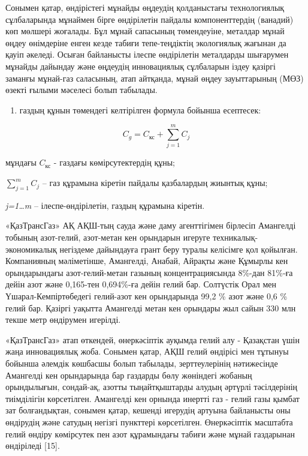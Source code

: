 \begin{multicols}{2}
Сонымен қатар, өндірістегі мұнайды өңдеудің қолданыстағы технологиялық
сұлбаларында мұнаймен бірге өндірілетін пайдалы компоненттердің
(ванадий) көп мөлшері жоғалады. Бұл мұнай сапасының төмендеуіне,
металдар мұнай өңдеу өнімдеріне енген кезде табиғи тепе-теңдіктің
экологиялық жағынан да қауіп әкеледі. Осыған байланысты ілеспе
өндірілетін металдарды шығарумен мұнайды дайындау және өңдеудің
инновациялық сұлбаларын іздеу қазіргі заманғы мұнай-газ саласының, атап
айтқанда, мұнай өңдеу зауыттарының (МӨЗ) өзекті ғылыми мәселесі болып
табылады.

\begin{enumerate}
\def\labelenumi{\arabic{enumi})}
\setcounter{enumi}{1}
\item
  газдың құнын төмендегі келтірілген формула бойынша есептесек:
\end{enumerate}
\begin{equation}
  C_g = C_{\text{кс}} + \sum_{j=1}^{m} C_j
  \end{equation}
  

мұндағы $C_{\text{кс}}$ - газдағы көмірсутектердің құны;

$\sum_{j=1}^{m} C_j$ -- газ құрамына кіретін пайдалы қазбалардың
жиынтық құны;

\emph{j=1\ldots m} -- ілеспе-өндірілетін, газдың құрамына кіретін.

«ҚазТрансГаз» АҚ АҚШ-тың сауда және даму агенттігімен бірлесіп Амангелді
тобының азот-гелий, азот-метан кен орындарын игеруге
техникалық-экономикалық негіздеме дайындауға грант беру туралы келісімге
қол қойылған. Компанияның мәліметінше, Амангелді, Анабай, Айрақты және
Құмырлы кен орындарындағы азот-гелий-метан газының концентрациясында
8\%-дан 81\%-ға дейін азот және 0,165-тен 0,694\%-ға дейін гелий бар.
Солтүстік Орал мен Үшарал-Кемпіртөбедегі гелий-азот кен орындарында 99,2
\% азот және 0,6 \% гелий бар. Қазіргі уақытта Амангелді метан кен
орындары жыл сайын 330 млн текше метр өндірумен игерілді.

«ҚазТрансГаз» атап өткендей, өнеркәсіптік ауқымда гелий алу - Қазақстан
үшін жаңа инновациялық жоба. Сонымен қатар, АҚШ гелий өндірісі мен
тұтынуы бойынша әлемдік көшбасшы болып табылады, зерттеулерінің
нәтижесінде Амангелді кен орындарында бар газдарды бөлу жөніндегі
жобаның орындылығын, сондай-ақ, азотты тыңайтқыштарды алудың әртүрлі
тәсілдерінің тиімділігін көрсетілген. Амангелді кен орнында инертті газ
- гелий газы қымбат зат болғандықтан, сонымен қатар, кешенді игерудің
артуына байланысты оны өндірудің және сатудың негізгі пункттері
көрсетілген. Өнеркәсіптік масштабта гелий өндіру көмірсутек пен азот
құрамындағы табиғи және мұнай газдарынан өндіріледі {[}15{]}.


\end{multicols}
